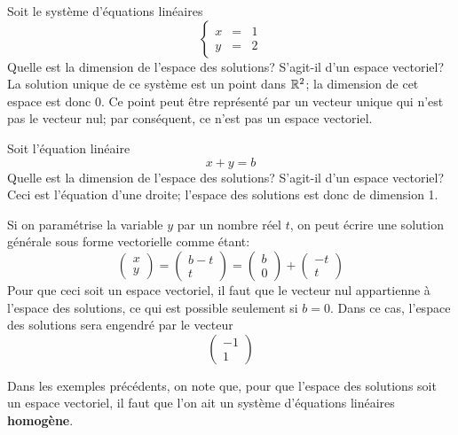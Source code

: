 \begin{exemple}
Soit le système d'équations linéaires
\[
\left\{ \begin{matrix}
x &=& 1\\
y &=& 2
\end{matrix}\right.
\]
Quelle est la dimension de l'espace des solutions?  S'agit-il d'un espace vectoriel?
\solution
La solution unique de ce système est un point dans $\mathbb{R}^2$;
la dimension de cet espace est donc 0.  Ce point peut être représenté par un vecteur unique
qui n'est pas le vecteur nul; par conséquent, ce n'est pas un espace vectoriel.
\end{exemple}
\begin{exemple}
Soit l'équation linéaire
\[
x + y = b
\]
Quelle est la dimension de l'espace des solutions?  S'agit-il d'un espace vectoriel?
\solution
Ceci est l'équation d'une droite; l'espace des solutions est donc de dimension 1.

Si on paramétrise la variable $y$ par un nombre réel $t$, on peut écrire une solution générale sous forme vectorielle comme étant:
\[
\begin{pmatrix}
x \\ y
\end{pmatrix}
= \begin{pmatrix}
b-t \\
t
\end{pmatrix}
=
\begin{pmatrix}
b\\0
\end{pmatrix}
+ \begin{pmatrix}
-t \\ t
\end{pmatrix}
\]
Pour que ceci soit un espace vectoriel, il faut que le vecteur nul appartienne à l'espace des solutions, 
ce qui est possible seulement si $b=0$.  Dans ce cas, l'espace des solutions sera engendré par le vecteur
\[
\begin{pmatrix}
-1 \\ 1
\end{pmatrix}
\]
\end{exemple}
Dans les exemples précédents, on note que, pour que l'espace des solutions soit un espace vectoriel,
il faut que l'on ait un système d'équations linéaires \textbf{homogène}. 
